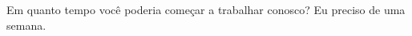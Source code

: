 
\begin{entrylist}
    \entry
    {}
    {Em quanto tempo você poderia começar a trabalhar conosco?}
    {}
    {
        Eu preciso de uma semana.
    }
\end{entrylist}
